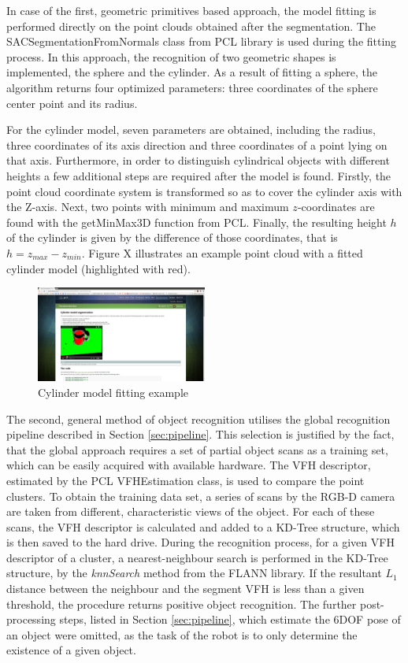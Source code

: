 	In case of the first, geometric primitives based approach, the model fitting is performed directly on the point clouds obtained after the segmentation. The SACSegmentationFromNormals class from PCL library is used during the fitting process. In this approach, the recognition of two geometric shapes is implemented, the sphere and the cylinder. As a result of fitting a sphere, the algorithm returns four optimized parameters: three coordinates of the sphere center point and its radius.
	
For the cylinder model, seven parameters are obtained, including the radius, three coordinates of its axis direction and three coordinates of a point lying on that axis. Furthermore, in order to distinguish cylindrical objects with different heights a few additional steps are required after the model is found. Firstly, the point cloud coordinate system is transformed so as to cover the cylinder axis with the Z-axis. Next, two points with minimum and maximum $z$-coordinates are found with the getMinMax3D function from PCL. Finally, the resulting height $h$ of the cylinder is given by the difference of those coordinates, that is $h = z_{max} - z_{min}$. Figure X illustrates an example point cloud with a fitted cylinder model (highlighted with red).

\begin{figure}[H]
\centering
\includegraphics[width=0.5\textwidth]{fig/cylinder}
\caption{Cylinder model fitting example \cite{pcl}}
\label{fig:cylinder}
\end{figure}

The second, general method of object recognition utilises the global recognition pipeline described in Section \ref{sec:pipeline}. This selection is justified by the fact, that the global approach requires a set of partial object scans as a training set, which can be easily acquired with available hardware. The VFH descriptor, estimated by the PCL VFHEstimation class, is used to compare the point clusters. To obtain the training data set, a series of scans by the RGB-D camera are taken from different, characteristic views of the object. For each of these scans, the VFH descriptor is calculated and added to a KD-Tree structure, which is then saved to the hard drive. During the recognition process, for a given VFH descriptor of a cluster, a nearest-neighbour search is performed in the KD-Tree structure, by the \textit{knnSearch} method from the FLANN library. If the resultant $L_1$ distance between the neighbour and the segment VFH is less than a given threshold, the procedure returns positive object recognition. The further post-processing steps, listed in Section \ref{sec:pipeline}, which estimate the 6DOF pose of an object were omitted, as the task of the robot is to only determine the existence of a given object.

